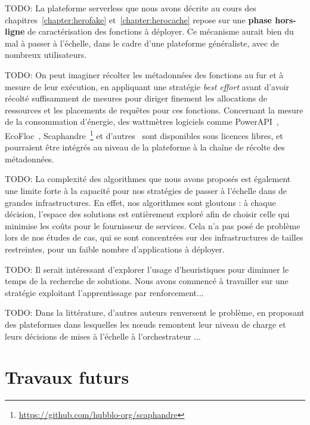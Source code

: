 TODO: La plateforme serverless que nous avons décrite au cours des chapitres~\ref{chapter:herofake} et~\ref{chapter:herocache} repose sur une \textbf{phase hors-ligne} de caractérisation des fonctions à déployer. Ce mécanisme aurait bien du mal à passer à l'échelle, dans le cadre d'une plateforme généraliste, avec de nombreux utilisateurs.

TODO: On peut imaginer récolter les métadonnées des fonctions au fur et à mesure de leur exécution, en appliquant une stratégie \textit{best effort} avant d'avoir récolté suffisamment de mesures pour diriger finement les allocations de ressources et les placements de requêtes pour ces fonctions. Concernant la mesure de la consommation d'énergie, des wattmètres logiciels comme PowerAPI~\cite{fieniPowerAPIPythonFramework2024}, EcoFloc~\cite{valeraEnergySavingPerspective}, Scaphandre~\footnote{\href{https://github.com/hubblo-org/scaphandre}{https://github.com/hubblo-org/scaphandre}} et d'autres~\cite{jayExperimentalComparisonSoftwarebased2023} sont disponibles sous licences libres, et pourraient être intégrés au niveau de la plateforme à la chaîne de récolte des métadonnées.

TODO: La complexité des algorithmes que nous avons proposés est également une limite forte à la capacité pour nos stratégies de passer à l'échelle dans de grandes infrastructures. En effet, nos algorithmes sont gloutons : à chaque décision, l'espace des solutions est entièrement exploré afin de choisir celle qui minimise les coûts pour le fournisseur de services. Cela n'a pas posé de problème lors de nos études de cas, qui se sont concentrées sur des infrastructures de tailles restreintes, pour un faible nombre d'applications à déployer.

TODO: Il serait intéressant d'explorer l'usage d'heuristiques pour diminuer le temps de la recherche de solutions. Nous avons commencé à travailler sur une stratégie exploitant l'apprentissage par renforcement...

TODO: Dans la littérature, d'autres auteurs renversent le problème, en proposant des plateformes dans lesquelles les nœuds remontent leur niveau de charge et leurs décisions de mises à l'échelle à l'orchestrateur \cite{straesserPowerApplicationsVision2023}...

\section{Travaux futurs}
\label{section:conclusion-perspectives}

